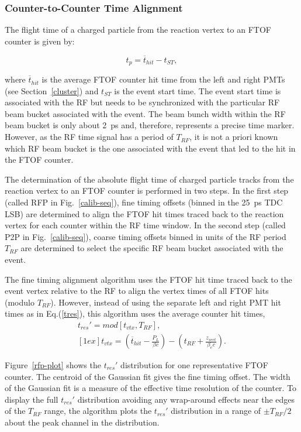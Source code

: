 \documentclass[final,3p,twocolumn]{elsarticle}
\begin{document}
\subsubsection{Counter-to-Counter Time Alignment}
\label{sec-talign}

The flight time of a charged particle from the reaction vertex to an FTOF counter is given by:

\begin{equation}
t_p = \overline{t}_{hit} - t_{ST},
\end{equation}

\noindent
where $\overline{t}_{hit}$ is the average FTOF counter hit time from the left and right PMTs (see
Section~\ref{cluster}) and $t_{ST}$ is the event start time. The event start time is associated with the
RF but needs to be synchronized with the particular RF beam bucket associated with the event. The
beam bunch width within the RF beam bucket is only about 2~ps and, therefore, represents a precise time
marker. However, as the RF time signal has a period of $T_{RF}$, it is not a priori known which RF beam
bucket is the one associated with the event that led to the hit in the FTOF counter.

The determination of the absolute flight time of charged particle tracks from the reaction vertex to an
FTOF counter is performed in two steps. In the first step (called RFP in Fig.~\ref{calib-seq}), fine timing
offsets (binned in the 25~ps TDC LSB) are determined to align the FTOF hit times traced back to the
reaction vertex for each counter within the RF time window. In the second step (called P2P in
Fig.~\ref{calib-seq}), coarse timing offsets binned in units of the RF period $T_{RF}$ are determined to
select the specific RF beam bucket associated with the event.

The fine timing alignment algorithm uses the FTOF hit time traced back to the event vertex relative
to the RF to align the vertex times of all FTOF hits (modulo $T_{RF}$). However, instead of using the
separate left and right PMT hit times as in Eq.(\ref{tres}), this algorithm uses the average counter
hit times, 
\begin{eqnarray}
t_{res}' = mod \left[ t_{vtx}, T_{RF} \right], ~~~~~\\ [1ex]
t_{vtx} = \left(\overline{t}_{hit} - \frac{P_L}{\beta c} \right) - 
\left(t_{RF} + \frac{z_{vert}}{\beta_e c} \right). \nonumber
\end{eqnarray}

Figure~\ref{rfp-plot} shows the $t_{res}'$ distribution for one representative FTOF counter. The
centroid of the Gaussian fit gives the fine timing offset. The width of the Gaussian fit is a measure
of the effective time resolution of the counter. To display the full $t_{res}'$ distribution avoiding any
wrap-around effects near the edges of the $T_{RF}$ range, the algorithm plots the $t_{res}'$ distribution
in a range of $\pm T_{RF}/2$ about the peak channel in the distribution.
\end{document}
